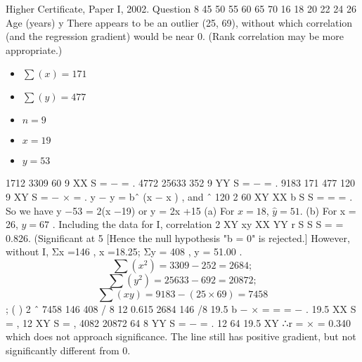 \documentclass[a4paper,12pt]{article}
\begin{document}
Higher Certificate, Paper I, 2002. Question 8
45
50
55
60
65
70
16 18 20 22 24 26
Age (years)
y
There appears to be an outlier (25, 69), without which correlation (and the regression
gradient) would be near 0. (Rank correlation may be more appropriate.)
\begin{itemize}
\item $\sum(x) =171$ 
\item $\sum(y) = 477$ 
\item $n = 9$ 
\item $x =19$ 
\item $y = 53$
\end{itemize}
1712 3309 60
9 XX S = − = .
4772 25633 352
9 YY S = − = . 9183 171 477 120
9 XY S = − × = .
y − y = bˆ (x − x ) , and ˆ 120 2
60
XY
XX
b S
S
= = = .
So we have y −53 = 2(x −19) or y = 2x +15
(a) For $x = 18$, $\hat{y} = 51$. (b) For x = 26, $\hat{y} = 67$ .
Including the data for I, correlation
2
XY
xy
XX YY
r S
S S
= = 0.826. (Significant at 5%
[Hence the null hypothesis "b = 0" is rejected.]
However, without I, Σx =146 , x =18.25; Σy = 408 , y = 51.00 .
\[\sum(x^2) = 3309 − 252 = 2684 ;\] 
\[\sum(y^2) = 25633− 692 = 20872 ;\]
\[\sum(xy) = 9183− (25 \times 69) = 7458\]; ( )
2
ˆ 7458 146 408 / 8 12 0.615
2684 146 /8 19.5
b
− ×
= = =
−
.
19.5 XX S = , 12 XY S = ,
4082 20872 64
8 YY S = − = .
12
64 19.5 XY ∴r =
×
= 0.340 which does not approach significance. The line still has
positive gradient, but not significantly different from 0.
\end{document}
